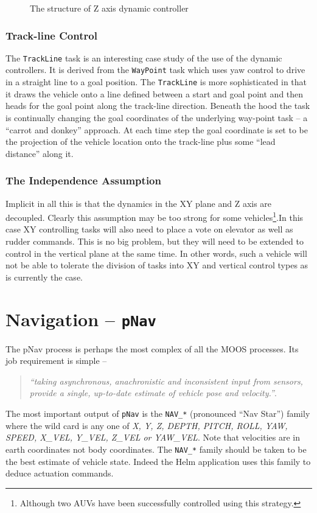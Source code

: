 \documentclass[a4paper,10pt]{article}
\newcommand{\Code}[1]{\texttt{#1} }
\newcommand{\code}[1]{\Code{#1} }
\begin{document}
\begin{figure}[ht]
 \centering {} \caption{The structure of Z axis dynamic controller}
\label{fig:ZPID}
\end{figure}


\subsubsection{Track-line Control}
The \code{TrackLine} task is an interesting case study of the use
of the dynamic controllers. It is derived from the \code{WayPoint}
task which uses yaw control to drive in a straight line to a goal
position. The \code{TrackLine} is more sophisticated in that it
draws the vehicle onto a line defined between  a start and goal
point and then heads for the goal point along the track-line
direction. Beneath the hood the task is continually changing the
goal coordinates of the underlying way-point task -- a ``carrot
and donkey'' approach. At each time step the goal coordinate is
set to be the projection of the vehicle location onto the
track-line plus some ``lead distance'' along it.

\subsubsection{The Independence Assumption}
Implicit in all this is that the dynamics  in the XY plane and Z
axis are decoupled. Clearly this assumption may be too strong for
some vehicles\footnote{Although two AUVs have been successfully
controlled using this strategy.}.In this case XY controlling tasks
will also need to place a vote on elevator as well as rudder
commands. This is no big problem, but they will need to be
extended to control in the vertical plane at the same time. In
other words, such a vehicle will not be able to tolerate the
division of tasks into XY and vertical control types as is
currently the case.

\newpage
\section{Navigation -- \code{pNav}}
The pNav process is perhaps the most complex of all the MOOS
processes. Its job requirement is simple -- \begin{quote}
{\it{``taking asynchronous, anachronistic and inconsistent input
from sensors, provide a single, up-to-date estimate of vehicle
pose and velocity.''}}. \end{quote} The most important output of
\code{pNav} is the \code{NAV\_*} (pronounced ``Nav Star'') family where
the wild card is any one of {\it{X, Y, Z, DEPTH, PITCH, ROLL, YAW,
SPEED, X\_VEL, Y\_VEL, Z\_VEL or YAW\_VEL}}. Note that velocities
are in earth coordinates not body coordinates. The \code{NAV\_*}
family should be taken to be the best estimate of vehicle state.
Indeed the Helm application uses this family to deduce actuation
commands.
\end{document}
